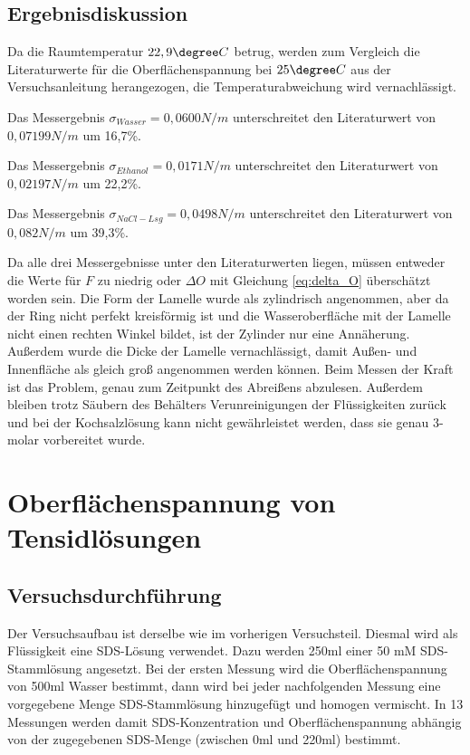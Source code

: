 \documentclass{scrartcl}
\begin{document}
\subsection{Ergebnisdiskussion}
Da die Raumtemperatur $22,9 \degree C$ betrug, werden zum Vergleich die Literaturwerte für die Oberflächenspannung bei $25 \degree C$ aus der Versuchsanleitung herangezogen, die Temperaturabweichung wird vernachlässigt.

Das Messergebnis $\sigma_{Wasser} = 0,0600N/m$ unterschreitet den Literaturwert von \\$0,07199N/m$ um 16,7\%.

Das Messergebnis $\sigma_{Ethanol} = 0,0171N/m$ unterschreitet den Literaturwert von \\$0,02197N/m$ um 22,2\%.

Das Messergebnis $\sigma_{NaCl-Lsg} = 0,0498N/m$ unterschreitet den Literaturwert von \\$0,082N/m$ um 39,3\%.

Da alle drei Messergebnisse unter den Literaturwerten liegen, müssen entweder die Werte für $F$ zu niedrig oder $\Delta O$ mit Gleichung \ref{eq:delta_O} überschätzt worden sein. Die Form der Lamelle wurde als zylindrisch angenommen, aber da der Ring nicht perfekt kreisförmig ist und die Wasseroberfläche mit der Lamelle nicht einen rechten Winkel bildet, ist der Zylinder nur eine Annäherung. Außerdem wurde die Dicke der Lamelle vernachlässigt, damit Außen- und Innenfläche als gleich groß angenommen werden können.
Beim Messen der Kraft ist das Problem, genau zum Zeitpunkt des Abreißens abzulesen.
Außerdem bleiben trotz Säubern des Behälters Verunreinigungen der Flüssigkeiten zurück und bei der Kochsalzlösung kann nicht gewährleistet werden, dass sie genau 3-molar vorbereitet wurde.
\newpage
\section{Oberflächenspannung von Tensidlösungen}
\subsection{Versuchsdurchführung}
Der Versuchsaufbau ist derselbe wie im vorherigen Versuchsteil. Diesmal wird als Flüssigkeit eine SDS-Lösung verwendet. Dazu werden 250ml einer 50 mM SDS-Stammlösung angesetzt.
Bei der ersten Messung wird die Oberflächenspannung von 500ml Wasser bestimmt, dann wird bei jeder nachfolgenden Messung eine vorgegebene Menge SDS-Stammlösung hinzugefügt und homogen vermischt.
In 13 Messungen werden damit SDS-Konzentration und Oberflächenspannung abhängig von der zugegebenen SDS-Menge (zwischen 0ml und 220ml) bestimmt.
\end{document}
